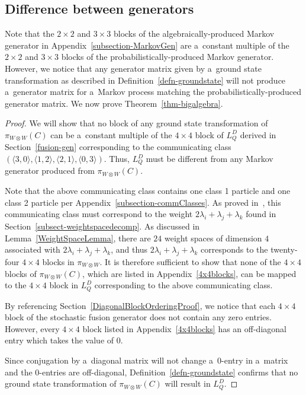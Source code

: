 \documentclass[pdftex]{sigma}
\numberwithin{equation}{section}
\theoremstyle{definition}
\begin{document}
\subsection{Difference between generators}
Note that the $2 \times 2$ and $3 \times 3$ blocks of the algebraically-produced Markov generator in Appendix~\ref{subsection-MarkovGen} are a~constant multiple of the $2 \times 2$ and $3 \times 3$ blocks of the probabilistically-produced Markov generator. However, we notice that any generator matrix given by a~ground state transformation as described in Definition~\ref{defn-groundstate} will not produce a~generator matrix for a~Markov process matching the probabilistically-produced generator matrix. We now prove Theorem~\ref{thm-bigalgebra}.

\begin{proof}
 We will show that no block of any ground state transformation of $\pi_{W \otimes W}(C)$ can be a~constant multiple of the $4\times 4$ block of $L^D_Q$ derived in Section~\ref{fusion-gen} corresponding to the communicating class $( \langle 3, 0\rangle, \langle1, 2\rangle, \langle2, 1\rangle, \langle0, 3\rangle)$.
 Thus, $L^D_Q$ must be different from any Markov generator produced from $\pi_{W \otimes W}(C)$.

 Note that the above communicating class contains one class 1 particle and one class 2 particle per Appendix~\ref{subsection-commClasses}. As proved in~\cite[Proposition 2.5]{kuan2020interactingparticlesystemstype}, this communicating class must correspond to the weight $2 \lambda_i + \lambda_j +\lambda_k$
 found in Section~\ref{subsect-weightspacedecomp}. As discussed in Lemma~\ref{WeightSpaceLemma}, there are $24$ weight spaces of dimension $4$ associated with $2 \lambda_i + \lambda_j +\lambda_k$, and thus $2 \lambda_i + \lambda_j +\lambda_k$ corresponds to the twenty-four $4 \times 4$ blocks in $\pi_{W \otimes W}$. It is therefore sufficient to show that none of the $4 \times 4$ blocks of $\pi_{W \otimes W}(C)$, which are listed in Appendix~\ref{4x4blocks}, can be mapped to the $4 \times 4$ block in $L^D_Q$ corresponding to the above communicating class.

 By referencing Section~\ref{DiagonalBlockOrderingProof}, we notice that each $4 \times 4$ block of the stochastic fusion generator does not contain any zero entries. However, every $4 \times 4$ block listed in Appendix~\ref{4x4blocks} has an off-diagonal entry which takes the value of $0$.

 Since conjugation by a~diagonal matrix will not change a~$0$-entry in a~matrix and the $0$-entries are off-diagonal, Definition~\ref{defn-groundstate} confirms that no ground state transformation of $\pi_{W \otimes W}(C)$ will result in $L^D_Q$.
\end{proof}
\end{document}
